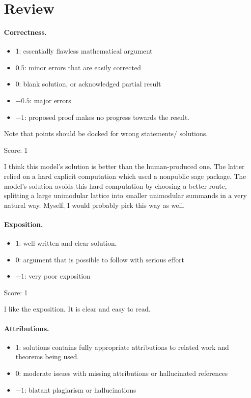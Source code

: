\documentclass[11pt]{article}
\theoremstyle{definition}
\theoremstyle{remark}
\begin{document}
\maketitle

\section{Review}

\paragraph{Correctness.}
\begin{itemize}
	\item  1: essentially flawless mathematical argument
	\item  0.5: minor errors that are easily corrected
	\item  0: blank solution, or acknowledged partial result
	\item  $-0.5$: major errors
	\item  $-1$: proposed proof makes no progress towards the result.
\end{itemize}
Note that points should be docked for wrong statements/ solutions.

\noindent Score: 1

I think this model's solution is better than the human-produced one. The latter relied on a hard explicit computation which used a nonpublic sage package. The model's solution avoids this hard computation by choosing a better route, splitting a large unimodular lattice into smaller unimodular summands in a very natural way. Myself, I would probably pick this way as well.

\paragraph{Exposition.}
\begin{itemize}
	\item  1: well-written and clear solution.
	\item  0: argument that is possible to follow with serious effort
	\item  $-1$: very poor exposition
\end{itemize}

\noindent Score: 1

I like the exposition. It is clear and easy to read.

\paragraph{Attributions.}
\begin{itemize}
	\item  1: solutions contains fully appropriate attributions
		to related work and theorems being used.
	\item  0: moderate issues with missing attributions or hallucinated references
	\item  $-1$: blatant plagiarism or hallucinations
\end{itemize}
\end{document}

